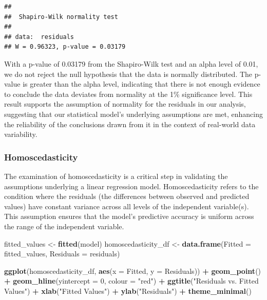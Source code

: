 \documentclass[
]{article}
\newenvironment{Shaded}{\begin{snugshade}}{\end{snugshade}}
\newcommand{\AttributeTok}[1]{\textcolor[rgb]{0.13,0.29,0.53}{#1}}
\newcommand{\DecValTok}[1]{\textcolor[rgb]{0.00,0.00,0.81}{#1}}
\newcommand{\FunctionTok}[1]{\textcolor[rgb]{0.13,0.29,0.53}{\textbf{#1}}}
\newcommand{\NormalTok}[1]{#1}
\newcommand{\OtherTok}[1]{\textcolor[rgb]{0.56,0.35,0.01}{#1}}
\newcommand{\SpecialCharTok}[1]{\textcolor[rgb]{0.81,0.36,0.00}{\textbf{#1}}}
\newcommand{\StringTok}[1]{\textcolor[rgb]{0.31,0.60,0.02}{#1}}
\begin{document}
\begin{verbatim}
## 
##  Shapiro-Wilk normality test
## 
## data:  residuals
## W = 0.96323, p-value = 0.03179
\end{verbatim}

With a p-value of 0.03179 from the Shapiro-Wilk test and an alpha level
of 0.01, we do not reject the null hypothesis that the data is normally
distributed. The p-value is greater than the alpha level, indicating
that there is not enough evidence to conclude the data deviates from
normality at the 1\% significance level. This result supports the
assumption of normality for the residuals in our analysis, suggesting
that our statistical model's underlying assumptions are met, enhancing
the reliability of the conclusions drawn from it in the context of
real-world data variability.

\hypertarget{homoscedasticity-1}{%
\subsubsection{Homoscedasticity}\label{homoscedasticity-1}}

The examination of homoscedasticity is a critical step in validating the
assumptions underlying a linear regression model. Homoscedasticity
refers to the condition where the residuals (the differences between
observed and predicted values) have constant variance across all levels
of the independent variable(s). This assumption ensures that the model's
predictive accuracy is uniform across the range of the independent
variable.

\begin{Shaded}
\begin{Highlighting}[]
\NormalTok{fitted\_values }\OtherTok{\textless{}{-}} \FunctionTok{fitted}\NormalTok{(model)}
\NormalTok{homoscedasticity\_df }\OtherTok{\textless{}{-}} \FunctionTok{data.frame}\NormalTok{(}\AttributeTok{Fitted =}\NormalTok{ fitted\_values, }\AttributeTok{Residuals =}\NormalTok{ residuals)}

\FunctionTok{ggplot}\NormalTok{(homoscedasticity\_df, }\FunctionTok{aes}\NormalTok{(}\AttributeTok{x =}\NormalTok{ Fitted, }\AttributeTok{y =}\NormalTok{ Residuals)) }\SpecialCharTok{+}
  \FunctionTok{geom\_point}\NormalTok{() }\SpecialCharTok{+}
  \FunctionTok{geom\_hline}\NormalTok{(}\AttributeTok{yintercept =} \DecValTok{0}\NormalTok{, }\AttributeTok{colour =} \StringTok{"red"}\NormalTok{) }\SpecialCharTok{+}
  \FunctionTok{ggtitle}\NormalTok{(}\StringTok{"Residuals vs. Fitted Values"}\NormalTok{) }\SpecialCharTok{+}
  \FunctionTok{xlab}\NormalTok{(}\StringTok{"Fitted Values"}\NormalTok{) }\SpecialCharTok{+}
  \FunctionTok{ylab}\NormalTok{(}\StringTok{"Residuals"}\NormalTok{) }\SpecialCharTok{+}
  \FunctionTok{theme\_minimal}\NormalTok{()}
\end{Highlighting}
\end{Shaded}
\end{document}
